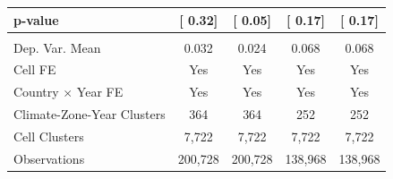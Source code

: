 {\begin{tabular}{l*{4}{c}}
\hspace{15pt} p-value&[     0.32]         &[     0.05]         &[     0.17]         &[     0.17]         \\
\hline \\ Dep. Var. Mean& 0.032         & 0.024         & 0.068         & 0.068         \\
Cell FE             &   Yes         &   Yes         &   Yes         &   Yes         \\
Country $\times$ Year FE&   Yes         &   Yes         &   Yes         &   Yes         \\
Climate-Zone-Year Clusters&   364         &   364         &   252         &   252         \\
Cell Clusters       & 7,722         & 7,722         & 7,722         & 7,722         \\
Observations        &200,728         &200,728         &138,968         &138,968         \\
\bottomrule
\end{tabular}
}

